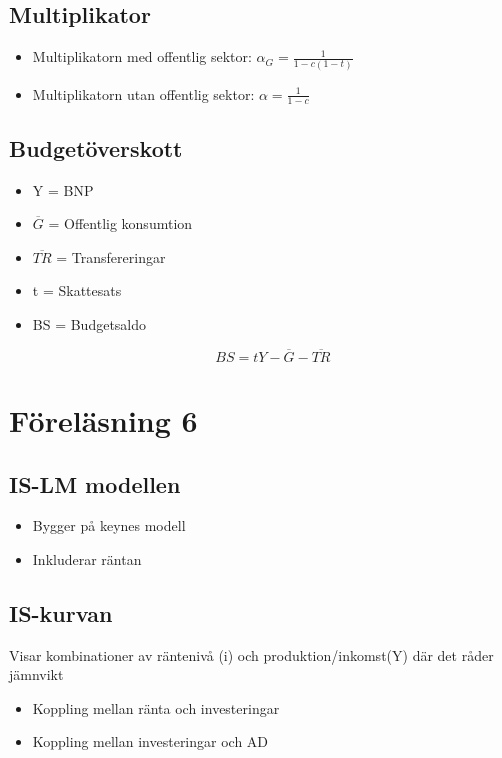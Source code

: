 \documentclass[12pt,a4paper]{article}
\begin{document}
\subsection*{Multiplikator}
\begin{itemize}
    \item Multiplikatorn med offentlig sektor: $\alpha_G = \frac{1}{1-c(1-t)}$
    \item Multiplikatorn utan offentlig sektor: $\alpha = \frac{1}{1-c}$
\end{itemize}

\subsection*{Budgetöverskott}
\begin{itemize}
    \item Y = BNP
    \item $\overline{G}$ = Offentlig konsumtion
    \item $\overline{TR}$ = Transfereringar
    \item t = Skattesats
    \item BS = Budgetsaldo

$$BS = tY - \overline{G} - \overline{TR}$$
\end{itemize}

\section*{Föreläsning 6}
\subsection*{IS-LM modellen}
\begin{itemize}
    \item Bygger på keynes modell
    \item Inkluderar räntan
\end{itemize}

\subsection*{IS-kurvan}
Visar kombinationer av räntenivå (i) och produktion/inkomst(Y) där det råder jämnvikt
\begin{itemize}
    \item Koppling mellan ränta och investeringar
    \item Koppling mellan investeringar och AD
\end{itemize}
\end{document}
